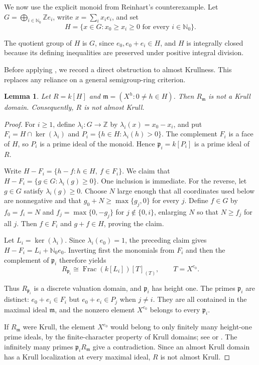 \documentclass[11pt]{amsart}
\newtheorem{lemma}[lemma]{Lemma}
\theoremstyle{definition}
\theoremstyle{remark}
\begin{document}
We now use the explicit monoid from Reinhart's counterexample.  Let
$G=\bigoplus_{i\in\mathbb N_0}\mathbb Ze_i$, write
$x=\sum_i x_i e_i$, and set
\begin{equation}\label{eq:H}
 H=\{x\in G:x_0\geq x_i\geq0\text{ for every }i\in\mathbb N_0\}.
\end{equation}

The quotient group of $H$ is $G$, since $e_0,e_0+e_i\in H$, and $H$ is
integrally closed because its defining inequalities are preserved under
positive integral division.

Before applying , we record a direct obstruction to almost
Krullness.  This replaces any reliance on a general semigroup-ring criterion.

\begin{lemma}\label{lem:not-AK}
Let $R=k[H]$ and
$\mathfrak m=(X^h:0\ne h\in H)$.  Then $R_{\mathfrak m}$ is not a Krull
domain.  Consequently, $R$ is not almost Krull.
\end{lemma}

\begin{proof}
For $i\geq1$, define $\lambda_i:G\to\mathbb Z$ by
$\lambda_i(x)=x_0-x_i$, and put
$F_i=H\cap\ker(\lambda_i)$ and
$P_i=\{h\in H:\lambda_i(h)>0\}$.  The complement $F_i$ is a face of $H$,
so $P_i$ is a prime ideal of the monoid.  Hence
$\mathfrak p_i=k[P_i]$ is a prime ideal of $R$.

Write $H-F_i=\{h-f:h\in H,\ f\in F_i\}$.  We claim that
$H-F_i=\{g\in G:\lambda_i(g)\geq0\}$.  One inclusion is immediate.  For
the reverse, let $g\in G$ satisfy $\lambda_i(g)\geq0$.  Choose $N$ large
enough that all coordinates used below are nonnegative and that
$g_0+N\geq\max\{g_j,0\}$ for every $j$.  Define $f\in G$ by
$f_0=f_i=N$ and $f_j=\max\{0,-g_j\}$ for $j\notin\{0,i\}$, enlarging $N$
so that $N\geq f_j$ for all $j$.  Then $f\in F_i$ and $g+f\in H$, proving
the claim.

Let $L_i=\ker(\lambda_i)$.  Since $\lambda_i(e_0)=1$, the preceding claim
gives $H-F_i=L_i+\mathbb N_0e_0$.  Inverting first the monomials from $F_i$
and then the complement of $\mathfrak p_i$ therefore yields
\begin{equation}\label{eq:DVR-localization}
 R_{\mathfrak p_i}
 \cong \operatorname{Frac}(k[L_i])[T]_{(T)},
 \qquad T=X^{e_0}.
\end{equation}

Thus $R_{\mathfrak p_i}$ is a discrete valuation domain, and
$\mathfrak p_i$ has height one.  The primes $\mathfrak p_i$ are distinct:
$e_0+e_i\in F_i$ but $e_0+e_i\in P_j$ when $j\ne i$.  They are all
contained in the maximal ideal $\mathfrak m$, and the nonzero element
$X^{e_0}$ belongs to every $\mathfrak p_i$.

If $R_{\mathfrak m}$ were Krull, the element $X^{e_0}$ would belong to only
finitely many height-one prime ideals, by the finite-character property of
Krull domains; see \cite[Chapter~VII, Section~1]{BourbakiCA} or
\cite{HalterKoch}.  The infinitely many primes
$\mathfrak p_iR_{\mathfrak m}$ give a contradiction.  Since an almost Krull
domain has a Krull localization at every maximal ideal, $R$ is not almost
Krull.
\end{proof}
\end{document}
